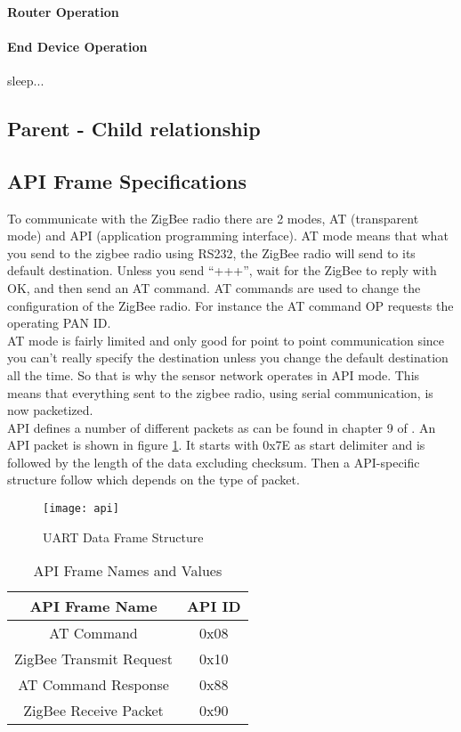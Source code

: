 \paragraph{Router Operation}
\paragraph{End Device Operation}
sleep...
\subsection{Parent - Child relationship}
\subsection{API Frame Specifications}
To communicate with the ZigBee radio there are 2 modes, AT (transparent mode) and API (application programming interface). AT mode means that what you send to the zigbee radio using RS232, the ZigBee radio will send to its default destination. Unless you send “+++”, wait for the ZigBee to reply with OK, and then send an AT command. AT commands are used to change the configuration of the ZigBee radio. For instance the AT command OP requests the operating PAN ID.\\
AT mode is fairly limited and only good for point to point communication since you can’t really specify the destination unless you change the default destination all the time. So that is why the sensor network operates in API mode. This means that everything sent to the zigbee radio, using serial communication, is now packetized.\\
API defines a number of different packets as can be found in chapter 9 of . An API packet is shown in figure \ref{fig:api}. It starts with 0x7E as start delimiter and is followed by the length of the data excluding checksum. Then a API-specific structure follow which depends on the type of packet.\\
\begin{figure}[htbp]
\centering
\texttt{[image: api]}
\caption{UART Data Frame Structure}
\label{fig:api}
\end{figure} 
\begin{table}[!ht]
\begin{center}
\begin{tabular}[!ht]{|c|c|}
\hline
\textbf{API Frame Name} & \textbf{API ID}\\
\hline
AT Command & 0x08\\
\hline
ZigBee Transmit Request & 0x10\\
\hline
AT Command Response & 0x88\\
\hline
ZigBee Receive Packet & 0x90\\
\hline
\end{tabular}
\caption{API Frame Names and Values}
\label{tab:apis}
\end{center}
\end{table}\\
